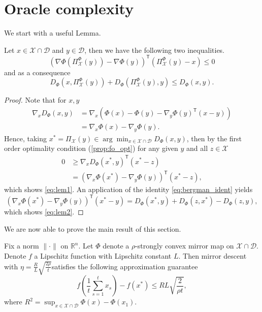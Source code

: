 \section{Oracle complexity}
\label{subsec:complexity}
We start with a useful Lemma.
\begin{lemma}
Let $x \in \mathcal{X}\cap \mathcal{D}$ and $y\in \mathcal{D}$, then we have the following two inequalities.
\begin{equation}\label{eq:lem1}
	\left(\nabla\Phi\left(\Pi_\mathcal{X}^\Phi(y) \right)- \nabla \Phi(y)\right)^\mathsf{T}\left(\Pi_\mathcal{X}^\Phi(y) - x \right) \leq 0
\end{equation}
and as a consequence
\begin{equation}\label{eq:lem2}
	D_\Phi(x, \Pi_\mathcal{X}^\Phi(y)) + D_\Phi(\Pi_\mathcal{X}^\Phi(y), y) \leq D_\Phi(x, y).
\end{equation}
\end{lemma}
\begin{proof}
Note that for $x, y$
\begin{align*}
	\nabla_x D_\Phi(x, y) &= \nabla_x \left(\Phi(x) - \Phi(y) - \nabla_y\Phi(y)^\mathsf{T}(x - y) \right)	\\
	&=	\nabla_x \Phi(x) - \nabla_y \Phi(y).
\end{align*}
Hence, taking $x^* = \Pi_\mathcal{X}(y) \in \arg \min_{x\in \mathcal{X}\cap\mathcal{D}} D_\Phi(x, y) $, then by the first order optimality condition (\autoref{prop:fo_opt}) for any given $y$ and all $z \in \mathcal{X}$
\begin{align*}
	0 & \geq \nabla_x D_\Phi(x^*, y)^\mathsf{T}(x^* - z) \\
	  & = \left(\nabla_x \Phi(x^*) - \nabla_y \Phi(y)\right)^\mathsf{T} (x^* - z),
\end{align*}
which shows \eqref{eq:lem1}. An application of the identity \eqref{eq:bergman_ident} yields 
\begin{equation*}
	\left(\nabla_x \Phi(x^*) - \nabla_y \Phi(y)\right)^\mathsf{T} (x^* - y) = D_\Phi(x^*, y) + D_\Phi(z, x^*) - D_\Phi(z, y),
\end{equation*}
which shows \eqref{eq:lem2}.
\end{proof}

We are now able to prove the main result of this section.
\begin{theorem}\label{compl:mirror_descent}
Fix a norm $\|\cdot \|$ on $\mathbb{R}^n$. Let $\Phi$ denote a $\rho$-strongly convex mirror map on $\mathcal{X}\cap\mathcal{D}$. Denote $f$ a Lipschitz function with Lipschitz constant $L$. Then mirror descent with $\eta =\frac{R}{L}\sqrt{\frac{2\rho}{t}}$satisfies the following approximation guarantee
\begin{equation*}
	f\left(\frac{1}{t}\sum_{s=1}^t x_s \right) - f(x^*) \leq RL\sqrt{\frac{2}{\rho t}},
\end{equation*}
where $R^2 = \sup_{x\in \mathcal{X}\cap\mathcal{D}}\Phi(x)-\Phi(x_1)$.
\end{theorem}

